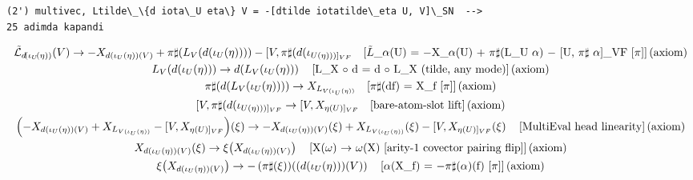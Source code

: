 \documentclass[11pt]{article}
\newcommand{\prompt}[4]{
        {\ttfamily\llap{{\color{#2}[#3]:\hspace{3pt}#4}}\vspace{-\baselineskip}}
    }
\begin{document}
    \begin{Verbatim}[commandchars=\\\{\}]
(2') multivec, Ltilde\_\{d iota\_U eta\} V = -[dtilde iotatilde\_eta U, V]\_SN  -->
25 adimda kapandi
    \end{Verbatim}
 
            
\prompt{Out}{outcolor}{7}{}
    
    {\allowdisplaybreaks\scriptsize
\begin{gather*}
\tilde{\mathcal{L}}_{d\!\left(\iota_U\!\left(\eta\right)\right)}\!\left(V\right) \to -X_{d(\iota_U(\eta))(V)} + \pi\sharp\!\left(L_V\!\left(d\!\left(\iota_U\!\left(\eta\right)\right)\right)\right) - [V,\pi\sharp(d(\iota_{U(\eta)))]_{VF}} \quad \text{[\ensuremath{\tilde{L}}\_\ensuremath{\alpha}(U) = \ensuremath{-}X\_{\ensuremath{\alpha}(U)} + \ensuremath{\pi}\ensuremath{\sharp}(L\_U \ensuremath{\alpha}) \ensuremath{-} [U, \ensuremath{\pi}\ensuremath{\sharp} \ensuremath{\alpha}]\_VF [\ensuremath{\pi}]]\,(axiom)} \\
L_V\!\left(d\!\left(\iota_U\!\left(\eta\right)\right)\right) \to d\!\left(L_V\!\left(\iota_U\!\left(\eta\right)\right)\right) \quad \text{[L\_X \ensuremath{\circ} d = d \ensuremath{\circ} L\_X (tilde, any mode)]\,(axiom)} \\
\pi\sharp\!\left(d\!\left(L_V\!\left(\iota_U\!\left(\eta\right)\right)\right)\right) \to X_{L_{V(\iota_U(\eta))}} \quad \text{[\ensuremath{\pi}\ensuremath{\sharp}(df) = X\_f [\ensuremath{\pi}]]\,(axiom)} \\
[V,\pi\sharp(d(\iota_{U(\eta)))]_{VF}} \to [V,X_{\eta(U)]_{VF}} \quad \text{[bare-atom-slot lift]\,(axiom)} \\
\left(-X_{d(\iota_U(\eta))(V)} + X_{L_{V(\iota_U(\eta))}} - [V,X_{\eta(U)]_{VF}}\right)\!\left(\xi\right) \to -X_{d(\iota_U(\eta))(V)}\!\left(\xi\right) + X_{L_{V(\iota_U(\eta))}}\!\left(\xi\right) - [V,X_{\eta(U)]_{VF}}\!\left(\xi\right) \quad \text{[MultiEval head linearity]\,(axiom)} \\
X_{d(\iota_U(\eta))(V)}\!\left(\xi\right) \to \xi\!\left(X_{d(\iota_U(\eta))(V)}\right) \quad \text{[X(\ensuremath{\omega}) \ensuremath{\to} \ensuremath{\omega}(X)  [arity-1 covector pairing flip]]\,(axiom)} \\
\xi\!\left(X_{d(\iota_U(\eta))(V)}\right) \to -\left(\pi\sharp\!\left(\xi\right)\right)\!\left(\left(d\!\left(\iota_U\!\left(\eta\right)\right)\right)\!\left(V\right)\right) \quad \text{[\ensuremath{\alpha}(X\_f) = \ensuremath{-}\ensuremath{\pi}\ensuremath{\sharp}(\ensuremath{\alpha})(f) [\ensuremath{\pi}]]\,(axiom)} \\

\end{gather*}}
\end{document}
